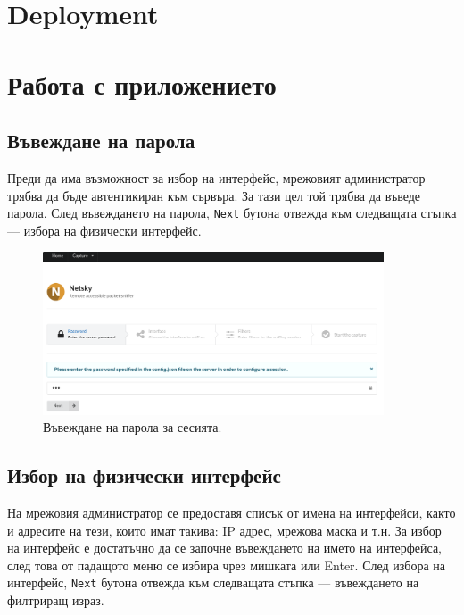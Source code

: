 \documentclass[12pt,a4paper,oneside]{book}
\begin{document}
\section{Deployment}

\section{Работа с приложението}

\subsection{Въвеждане на парола}

Преди да има възможност за избор на интерфейс, мрежовият администратор
трябва да бъде автентикиран към сървъра. За тази цел той трябва да въведе парола.
След въвеждането на парола, \texttt{Next} бутона отвежда към следващата стъпка ---
избора на физически интерфейс.

\begin{figure}[h!]
  \centering
  \includegraphics[width=0.9\textwidth]{figures/screenshots/password.png}
  \caption{Въвеждане на парола за сесията.}
  \label{screenshots_password_fig}
\end{figure}

\subsection{Избор на физически интерфейс}

На мрежовия администратор се предоставя списък от имена на интерфейси, както и
адресите на тези, които имат такива: IP адрес, мрежова маска и т.н. За избор на
интерфейс е достатъчно да се започне въвеждането на името на интерфейса, след
това от падащото меню се избира чрез мишката или Enter. След избора на интерфейс,
\texttt{Next} бутона отвежда към следващата стъпка ---
въвеждането на филтриращ израз.
\end{document}
